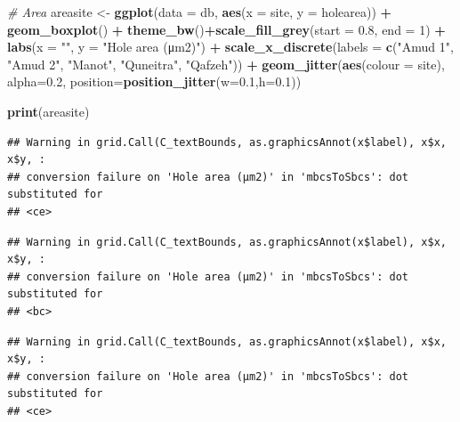 \documentclass[
]{article}
\newenvironment{Shaded}{\begin{snugshade}}{\end{snugshade}}
\newcommand{\AttributeTok}[1]{\textcolor[rgb]{0.13,0.29,0.53}{#1}}
\newcommand{\CommentTok}[1]{\textcolor[rgb]{0.56,0.35,0.01}{\textit{#1}}}
\newcommand{\DecValTok}[1]{\textcolor[rgb]{0.00,0.00,0.81}{#1}}
\newcommand{\FloatTok}[1]{\textcolor[rgb]{0.00,0.00,0.81}{#1}}
\newcommand{\FunctionTok}[1]{\textcolor[rgb]{0.13,0.29,0.53}{\textbf{#1}}}
\newcommand{\NormalTok}[1]{#1}
\newcommand{\OtherTok}[1]{\textcolor[rgb]{0.56,0.35,0.01}{#1}}
\newcommand{\SpecialCharTok}[1]{\textcolor[rgb]{0.81,0.36,0.00}{\textbf{#1}}}
\newcommand{\StringTok}[1]{\textcolor[rgb]{0.31,0.60,0.02}{#1}}
\begin{document}
\begin{Shaded}
\begin{Highlighting}[]
\CommentTok{\# Area}
\NormalTok{areasite }\OtherTok{\textless{}{-}} \FunctionTok{ggplot}\NormalTok{(}\AttributeTok{data =}\NormalTok{ db, }\FunctionTok{aes}\NormalTok{(}\AttributeTok{x =}\NormalTok{ site, }\AttributeTok{y =}\NormalTok{ holearea)) }\SpecialCharTok{+}  
           \FunctionTok{geom\_boxplot}\NormalTok{() }\SpecialCharTok{+}
           \FunctionTok{theme\_bw}\NormalTok{()}\SpecialCharTok{+}\FunctionTok{scale\_fill\_grey}\NormalTok{(}\AttributeTok{start =} \FloatTok{0.8}\NormalTok{, }\AttributeTok{end =} \DecValTok{1}\NormalTok{) }\SpecialCharTok{+}
           \FunctionTok{labs}\NormalTok{(}\AttributeTok{x =} \StringTok{""}\NormalTok{, }\AttributeTok{y =} \StringTok{"Hole area (μm2)"}\NormalTok{) }\SpecialCharTok{+}
           \FunctionTok{scale\_x\_discrete}\NormalTok{(}\AttributeTok{labels =} \FunctionTok{c}\NormalTok{(}\StringTok{"Amud 1"}\NormalTok{, }\StringTok{"Amud 2"}\NormalTok{, }\StringTok{"Manot"}\NormalTok{, }\StringTok{"Quneitra"}\NormalTok{, }\StringTok{"Qafzeh"}\NormalTok{)) }\SpecialCharTok{+}
           \FunctionTok{geom\_jitter}\NormalTok{(}\FunctionTok{aes}\NormalTok{(}\AttributeTok{colour =}\NormalTok{ site), }\AttributeTok{alpha=}\FloatTok{0.2}\NormalTok{, }\AttributeTok{position=}\FunctionTok{position\_jitter}\NormalTok{(}\AttributeTok{w=}\FloatTok{0.1}\NormalTok{,}\AttributeTok{h=}\FloatTok{0.1}\NormalTok{)) }

\FunctionTok{print}\NormalTok{(areasite)}
\end{Highlighting}
\end{Shaded}

\begin{verbatim}
## Warning in grid.Call(C_textBounds, as.graphicsAnnot(x$label), x$x, x$y, :
## conversion failure on 'Hole area (μm2)' in 'mbcsToSbcs': dot substituted for
## <ce>
\end{verbatim}

\begin{verbatim}
## Warning in grid.Call(C_textBounds, as.graphicsAnnot(x$label), x$x, x$y, :
## conversion failure on 'Hole area (μm2)' in 'mbcsToSbcs': dot substituted for
## <bc>
\end{verbatim}

\begin{verbatim}
## Warning in grid.Call(C_textBounds, as.graphicsAnnot(x$label), x$x, x$y, :
## conversion failure on 'Hole area (μm2)' in 'mbcsToSbcs': dot substituted for
## <ce>
\end{verbatim}
\end{document}
